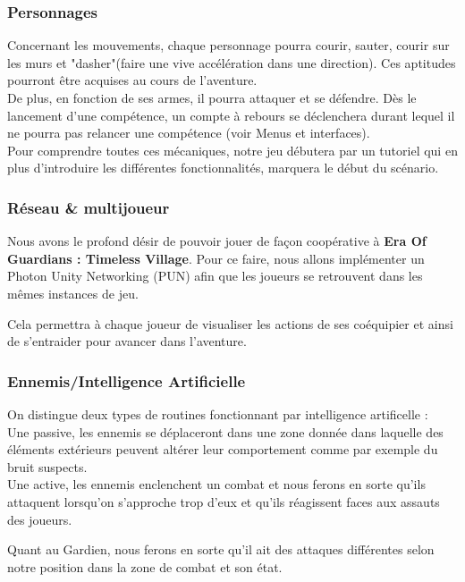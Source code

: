 \documentclass[12pt]{article}
\begin{document}
            \subsubsection{Personnages}
                
                Concernant les mouvements, chaque personnage pourra courir, sauter, courir sur les murs et "dasher"(faire une vive accélération dans une direction). Ces aptitudes pourront être acquises au cours de l'aventure.
                \\
                De plus, en fonction de ses armes, il pourra attaquer et se défendre.
                Dès le lancement d'une compétence, un compte à rebours se déclenchera durant lequel il ne pourra pas relancer une compétence (voir Menus et interfaces).
                \\
                Pour comprendre toutes ces mécaniques, notre jeu débutera par un tutoriel qui en plus d'introduire les différentes fonctionnalités, marquera le début du scénario.
                
            \subsubsection{Réseau \& multijoueur}
                Nous avons le profond désir de pouvoir jouer de façon coopérative à \textbf{Era Of Guardians : Timeless Village}. Pour ce faire, nous allons implémenter un Photon Unity Networking (PUN) afin que les joueurs se retrouvent dans les mêmes instances de jeu.
                
                \par Cela permettra à chaque joueur de visualiser les actions de ses coéquipier et ainsi de s'entraider pour avancer dans l'aventure.
            
            \subsubsection{Ennemis/Intelligence Artificielle}
                On distingue deux types de routines fonctionnant par intelligence artificelle :
                    \\ Une passive, les ennemis se déplaceront dans une zone donnée dans laquelle des éléments extérieurs peuvent altérer leur comportement comme par exemple du bruit suspects.
                    \\ Une active, les ennemis enclenchent un combat et nous ferons en sorte qu'ils attaquent lorsqu'on s'approche trop d'eux et qu'ils réagissent faces aux assauts des joueurs.
                \\
                \par Quant au Gardien, nous ferons en sorte qu'il ait des attaques différentes selon notre position dans la zone de combat et son état.
        \clearpage
\end{document}
